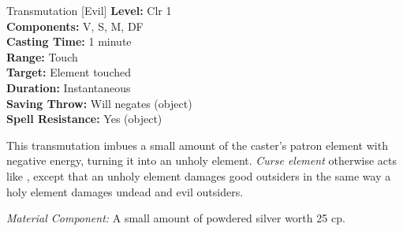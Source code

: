 {Transmutation [Evil]}
{
	\textbf{Level:}
	Clr 1\\
	\textbf{Components:}
	V, S, M, DF\\
	\textbf{Casting Time:}
	1 minute\\
	\textbf{Range:}
	Touch\\
	\textbf{Target:}
	Element touched\\
	\textbf{Duration:}
	Instantaneous\\
	\textbf{Saving Throw:}
	Will negates (object)\\
	\textbf{Spell Resistance:}
	Yes (object)\\
}
{
	This transmutation imbues a small amount of the caster's patron element with negative energy, turning it into an unholy element. \emph{Curse element} otherwise acts like , except that an unholy element damages good outsiders in the same way a holy element damages undead and evil outsiders.

	\textit{Material Component:} A small amount of powdered silver worth 25 cp.
}
